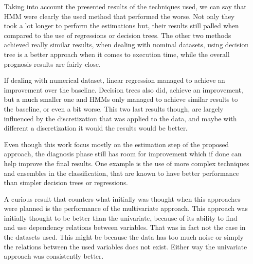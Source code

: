  Taking into account the presented results of the techniques used, we can say that HMM were clearly the used method that performed
  the worse. Not only they took a lot longer to perform the estimations but, their results still palled when compared to the use of 
  regressions or decision trees. The other two methods achieved really similar results, when dealing with nominal
  datasets, using decision tree is a better approach when it comes to execution time, while the overall prognosis results are fairly close. 
  
  If dealing with numerical dataset, linear regression managed to achieve an improvement over the baseline. Decision trees also did, achieve an improvement, but a much smaller one and HMMs only managed to achieve similar results to the baseline, or even a bit worse. This two last results though, are largely influenced by the discretization that was applied to the data, and maybe with different a discretization it would the results would be better.
  
  Even though this work focus mostly on the estimation step of the proposed approach, the diagnosis phase still has room for improvement which if done can help improve the final results. One example is the use of more complex techniques and ensembles in the classification, that are known to have better performance than simpler decision trees or regressions.
  
  A curious result that counters what initially was thought when this approaches were planned is the performance of the multivariate approach. This approach was initially thought to be better than the univariate, because of its ability to find and use dependency relations between variables. That was in fact not the case in the datasets used. This might be because the data has too much noise or simply the relations between the used variables does not exist. Either way the univariate approach was consistently better.
 
 
\cleardoublepage
